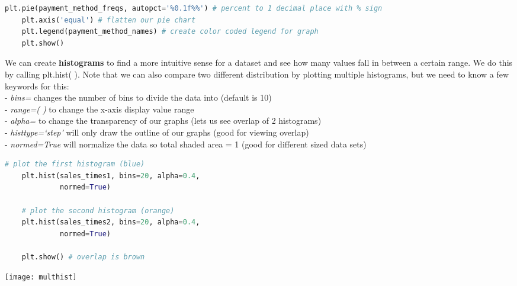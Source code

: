 \documentclass[11pt, a4paper]{article}
\begin{document}
\begin{spacing}{1.1}
\begin{lstlisting}[language=Python]
	plt.pie(payment_method_freqs, autopct='%0.1f%%') # percent to 1 decimal place with % sign
	plt.axis('equal') # flatten our pie chart
	plt.legend(payment_method_names) # create color coded legend for graph
	plt.show() \end{lstlisting}\vspace*{1mm}
	We can create \textbf{histograms} to find a more intuitive sense for a dataset and see how many values fall in between a certain range. We do this by calling plt.hist( ). Note that we can also compare two different distribution by plotting multiple histograms, but we need to know a few keywords for this: \\
	\hspace*{3mm} - \textit{bins=} changes the number of bins to divide the data into (default is 10) \\
	\hspace*{3mm} - \textit{range=( )} to change the x-axis display value range \\
	\hspace*{3mm} - \textit{alpha=} to change the transparency of our graphs (lets us see overlap of 2 histograms) \\
	\hspace*{3mm} - \textit{histtype=`step'} will only draw the outline of our graphs (good for viewing overlap) \\
	\hspace*{3mm} - \textit{normed=True} will normalize the data so total shaded area = 1 (good for different sized data sets)
	\begin{minipage}[c]{9cm}
	\begin{lstlisting}[language=Python]
	# plot the first histogram (blue)
	plt.hist(sales_times1, bins=20, alpha=0.4, 
	         normed=True)
	         
	# plot the second histogram (orange)
	plt.hist(sales_times2, bins=20, alpha=0.4, 
	         normed=True)
	         
	plt.show() # overlap is brown \end{lstlisting}\vspace*{1mm}
	\end{minipage}
	\begin{minipage}[c]{9cm}
	\texttt{[image: multhist]}
	\end{minipage} \newpage

\end{spacing}
\end{document}
